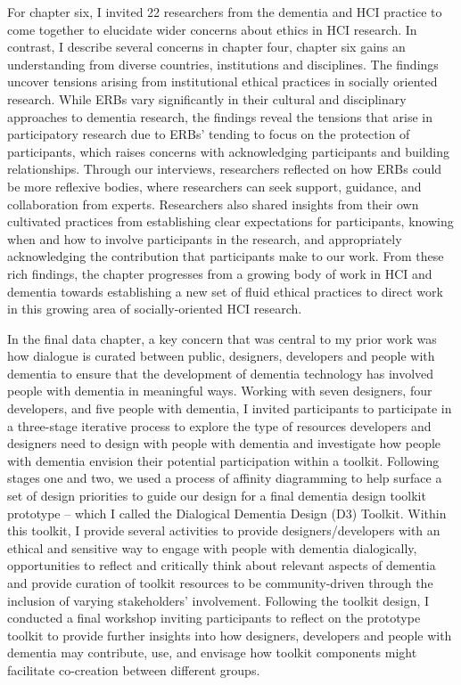 For chapter six, I invited 22 researchers from the dementia and HCI practice to come together to elucidate wider concerns about ethics in HCI research. In contrast, I describe several concerns in chapter four, chapter six gains an understanding from diverse countries, institutions and disciplines. The findings uncover tensions arising from institutional ethical practices in socially oriented research. While ERBs vary significantly in their cultural and disciplinary approaches to dementia research, the findings reveal the tensions that arise in participatory research due to ERBs’ tending to focus on the protection of participants, which raises concerns with acknowledging participants and building relationships. Through our interviews, researchers reflected on how ERBs could be more reflexive bodies, where researchers can seek support, guidance, and
collaboration from experts. Researchers also shared insights from their own cultivated practices from establishing clear expectations for participants, knowing when and how to involve participants in the research, and appropriately acknowledging the contribution that participants make to our work. From these rich findings, the chapter progresses from a growing body of work in HCI and dementia towards establishing a new set of fluid ethical practices to direct work in this growing area of socially-oriented HCI research.

In the final data chapter, a key concern that was central to my prior work was how dialogue is curated between public, designers, developers and people with dementia to ensure that the development of dementia technology has involved people with dementia in meaningful ways. Working with seven designers, four developers, and five people with dementia, I invited participants to participate in a three-stage iterative process to explore the type of resources developers and designers need to design with people with dementia and investigate how people with dementia envision their potential participation within a toolkit. Following stages one and two, we used a process of affinity diagramming to help surface a set of design priorities to guide our design for a final dementia design toolkit prototype – which I called the Dialogical Dementia Design (D3) Toolkit. Within this toolkit, I provide several activities to provide designers/developers with an ethical and sensitive way to engage with people with dementia dialogically, opportunities to reflect and critically think about relevant aspects of dementia and provide curation of toolkit resources to be community-driven through the inclusion of varying stakeholders' involvement. Following the toolkit design, I conducted a final workshop inviting participants to reflect on the prototype toolkit to provide further insights into how designers, developers and people with dementia may contribute, use, and envisage how toolkit components might facilitate co-creation between different groups. 

